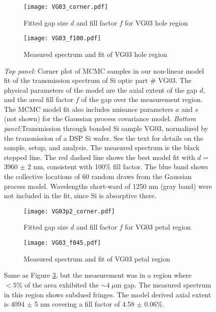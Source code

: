 \documentclass[osajnl,twocolumn,showpacs,superscriptaddress,11pt]{revtex4-1} %
\begin{document}
\begin{figure}[htbp]
        \centering
        \begin{subfigure}[b]{0.5\textwidth}
              \texttt{[image: VG03\_corner.pdf]}
              \caption{Fitted gap size $d$ and fill factor $f$ for VG03 hole region}
		\label{figVG03_corner}
        \end{subfigure}

        \begin{subfigure}[b]{0.5\textwidth}
                \texttt{[image: VG03\_f100.pdf]}
                \caption{Measured spectrum and fit of VG03 hole region}
                \label{figVG03_f100}
        \end{subfigure}
\caption{ \emph{Top panel:} Corner plot of MCMC samples in our non-linear model fit of the transmission spectrum of Si optic part \# VG03.  The physical parameters of the model are the axial extent of the gap $d$, and the areal fill factor $f$ of the gap over the measurement region.  The MCMC model fit also includes nuisance parameters $a$ and $s$ (not shown) for the Gaussian process covariance model.  \emph{Bottom panel:}Transmission through bonded Si sample VG03, normalized by the transmission of a DSP Si wafer. See the text for details on the sample, setup, and analysis.  The measured spectrum is the black stepped line.  The red dashed line shows the best model fit with $d$ = 3960 $\pm$ 2 nm, consistent with 100\% fill factor.  The blue band shows the collective locations of 60 random draws from the Gaussian process model.  Wavelengths short-ward of 1250 nm (gray band) were not included in the fit, since Si is absorptive there.\label{figVG03full} }
\end{figure}


\begin{figure}[htbp]
        \centering
        \begin{subfigure}[b]{0.5\textwidth}
              \texttt{[image: VG03p2\_corner.pdf]}
              \caption{Fitted gap size $d$ and fill factor $f$ for VG03 petal region}
		\label{figVG03p2_corner}
        \end{subfigure}

        \begin{subfigure}[b]{0.5\textwidth}
                \texttt{[image: VG03\_f045.pdf]}
                \caption{Measured spectrum and fit of VG03 petal region}
                \label{figVG03_f045}
        \end{subfigure}
\caption{ Same as Figure \ref{figVG03full}, but the measurement was in a region where $<5\%$ of the area exhibited the $\sim4\; \mu$m gap.  The measured spectrum in this region shows subdued fringes. The model derived axial extent is 4094 $\pm$ 5 nm covering a fill factor of 4.58 $\pm$ 0.06$\%$. \label{figVG03part}}
\end{figure}
\end{document}
